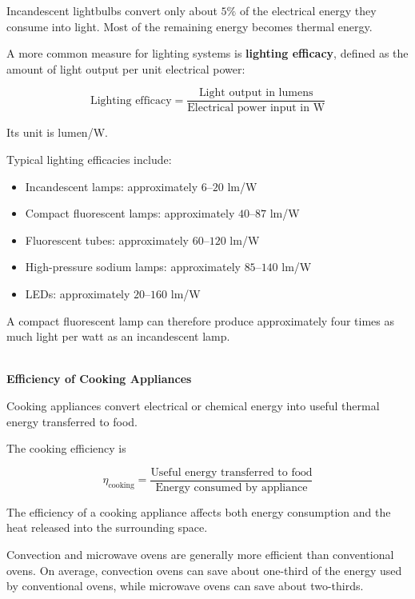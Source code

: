 \documentclass[12pt]{article}
\begin{document}
Incandescent lightbulbs convert only about $5\%$ of the electrical energy they consume into light. Most of the remaining energy becomes thermal energy. 

A more common measure for lighting systems is \textbf{lighting efficacy}, defined as the amount of light output per unit electrical power:

\begin{equation*}
\text{Lighting efficacy}
=
\frac{\text{Light output in lumens}}
{\text{Electrical power input in W}}
\end{equation*}

Its unit is lumen/W.

Typical lighting efficacies include:

\begin{itemize}
    \item Incandescent lamps: approximately $6$--$20$ lm/W
    \item Compact fluorescent lamps: approximately $40$--$87$ lm/W
    \item Fluorescent tubes: approximately $60$--$120$ lm/W
    \item High-pressure sodium lamps: approximately $85$--$140$ lm/W
    \item LEDs: approximately $20$--$160$ lm/W
\end{itemize}

A compact fluorescent lamp can therefore produce approximately four times as much light per watt as an incandescent lamp. 

\textbf{\\ Efficiency of Cooking Appliances}

Cooking appliances convert electrical or chemical energy into useful thermal energy transferred to food.

The cooking efficiency is

\begin{equation*}
\eta_{\mathrm{cooking}}
=
\frac{\text{Useful energy transferred to food}}
{\text{Energy consumed by appliance}}
\end{equation*}

The efficiency of a cooking appliance affects both energy consumption and the heat released into the surrounding space.

Convection and microwave ovens are generally more efficient than conventional ovens. On average, convection ovens can save about one-third of the energy used by conventional ovens, while microwave ovens can save about two-thirds. 
\end{document}
